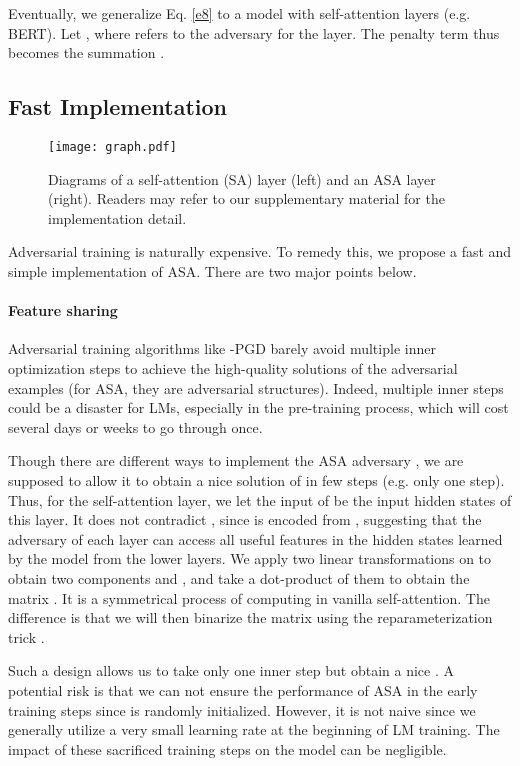 \documentclass[letterpaper]{article} \usepackage{aaai23}  \usepackage{times}  \usepackage{helvet}  \usepackage{courier}  \usepackage[hyphens]{url}  \usepackage{graphicx} \urlstyle{rm} \def\UrlFont{\rm}  \usepackage{natbib}  \usepackage{caption} \frenchspacing  \setlength{\pdfpagewidth}{8.5in}  \setlength{\pdfpageheight}{11in}  \usepackage{algorithm}
\begin{document}
Eventually, we generalize Eq. \ref{e8} to a model with  self-attention layers (e.g. BERT). Let , where  refers to the adversary for the  layer. The penalty term thus becomes the summation .

\subsection{Fast Implementation}
\label{fastasa}

\begin{figure}
\centering
\texttt{[image: graph.pdf]}
\caption{Diagrams of a self-attention (SA) layer (left) and an ASA layer (right). Readers may refer to our supplementary material for the implementation detail.}
\label{f2}
\end{figure}

Adversarial training is naturally expensive. To remedy this, we propose a fast and simple implementation of ASA. There are two major points below.

\paragraph{Feature sharing} Adversarial training algorithms like -PGD \citep{DBLP:conf/iclr/MadryMSTV18} barely avoid multiple inner optimization steps to achieve the high-quality solutions of the adversarial examples (for ASA, they are adversarial structures). Indeed, multiple inner steps could be a disaster for LMs, especially in the pre-training process, which will cost several days or weeks to go through once.

Though there are different ways to implement the ASA adversary , we are supposed to allow it to obtain a nice solution of  in few steps (e.g. only one step). Thus, for the  self-attention layer, we let the input of  be the input hidden states  of this layer. It does not contradict , since  is encoded from , suggesting that the adversary of each layer can access all useful features in the hidden states learned by the model from the lower layers. We apply two linear transformations on  to obtain two components  and , and take a dot-product of them to obtain the matrix . It is a symmetrical process of computing  in vanilla self-attention. The difference is that we will then binarize the matrix using the reparameterization trick \citep{DBLP:conf/iclr/JangGP17}.

Such a design allows us to take only one inner step but obtain a nice . A potential risk is that we can not ensure the performance of ASA in the early training steps since  is randomly initialized. However, it is not naive since we generally utilize a very small learning rate at the beginning of LM training. The impact of these sacrificed training steps on the model can be negligible.
\end{document}
